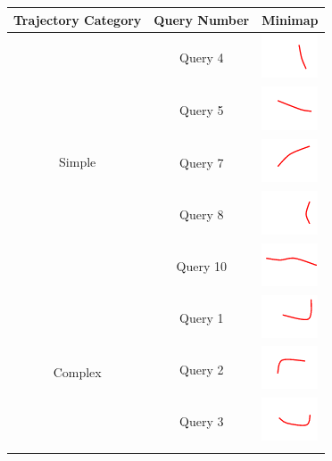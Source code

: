 \begin{table}[!ht] \centering
\begin{tabular}{|c|c|c|}
\hline
\multicolumn{1}{|c|}{\textbf{Trajectory Category}} & \textbf{Query Number} & \textbf{Minimap}\\ \hline
\multirow{5}{*}{Simple} & Query 4 & \includegraphics{image/minimaps/query_04.png} \\ \cline{2-3}
 & Query 5 & \includegraphics{image/minimaps/query_05.png} \\ \cline{2-3}
 & Query 7 & \includegraphics{image/minimaps/query_07.png} \\ \cline{2-3}
 & Query 8 & \includegraphics{image/minimaps/query_08.png} \\ \cline{2-3}
 & Query 10 & \includegraphics{image/minimaps/query_10.png} \\ \hline
\multirow{6}{*}{Complex} & Query 1 & \includegraphics{image/minimaps/query_01.png} \\ \cline{2-3}
 & Query 2 & \includegraphics{image/minimaps/query_02.png} \\ \cline{2-3}
 & Query 3 & \includegraphics{image/minimaps/query_03.png} \\ \cline{2-3}

\end{tabular}
\end{table}
